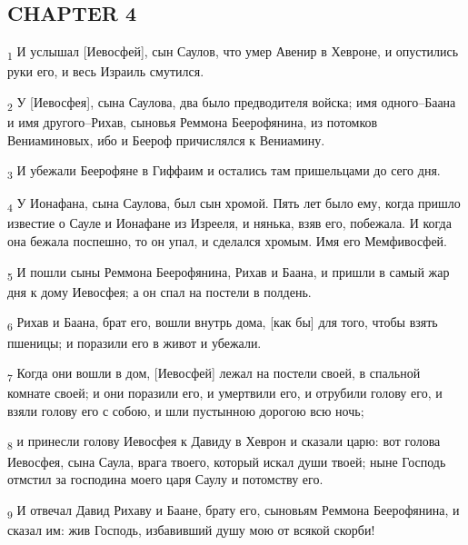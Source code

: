 \subsection{CHAPTER 4}
\begin{tcolorbox}
\textsubscript{1} И услышал [Иевосфей], сын Саулов, что умер Авенир в Хевроне, и опустились руки его, и весь Израиль смутился.
\end{tcolorbox}
\begin{tcolorbox}
\textsubscript{2} У [Иевосфея], сына Саулова, два было предводителя войска; имя одного--Баана и имя другого--Рихав, сыновья Реммона Беерофянина, из потомков Вениаминовых, ибо и Беероф причислялся к Вениамину.
\end{tcolorbox}
\begin{tcolorbox}
\textsubscript{3} И убежали Беерофяне в Гиффаим и остались там пришельцами до сего дня.
\end{tcolorbox}
\begin{tcolorbox}
\textsubscript{4} У Ионафана, сына Саулова, был сын хромой. Пять лет было ему, когда пришло известие о Сауле и Ионафане из Изрееля, и нянька, взяв его, побежала. И когда она бежала поспешно, то он упал, и сделался хромым. Имя его Мемфивосфей.
\end{tcolorbox}
\begin{tcolorbox}
\textsubscript{5} И пошли сыны Реммона Беерофянина, Рихав и Баана, и пришли в самый жар дня к дому Иевосфея; а он спал на постели в полдень.
\end{tcolorbox}
\begin{tcolorbox}
\textsubscript{6} Рихав и Баана, брат его, вошли внутрь дома, [как бы] для того, чтобы взять пшеницы; и поразили его в живот и убежали.
\end{tcolorbox}
\begin{tcolorbox}
\textsubscript{7} Когда они вошли в дом, [Иевосфей] лежал на постели своей, в спальной комнате своей; и они поразили его, и умертвили его, и отрубили голову его, и взяли голову его с собою, и шли пустынною дорогою всю ночь;
\end{tcolorbox}
\begin{tcolorbox}
\textsubscript{8} и принесли голову Иевосфея к Давиду в Хеврон и сказали царю: вот голова Иевосфея, сына Саула, врага твоего, который искал души твоей; ныне Господь отмстил за господина моего царя Саулу и потомству его.
\end{tcolorbox}
\begin{tcolorbox}
\textsubscript{9} И отвечал Давид Рихаву и Баане, брату его, сыновьям Реммона Беерофянина, и сказал им: жив Господь, избавивший душу мою от всякой скорби!
\end{tcolorbox}
